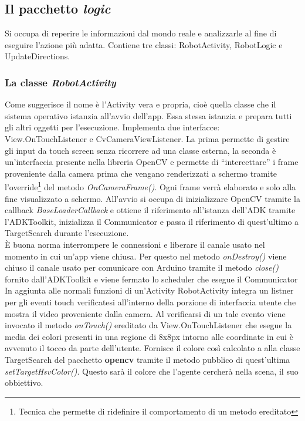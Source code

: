 \subsection {Il pacchetto \textit{logic}}
Si occupa di reperire le informazioni dal mondo reale e analizzarle al fine di
eseguire l'azione più adatta.
Contiene tre classi: RobotActivity, RobotLogic e UpdateDirections.
\subsubsection{La classe \emph{RobotActivity}}
Come suggerisce il nome è l'Activity vera e propria, cioè quella classe che il 
sistema operativo istanzia all'avvio dell'app. Essa stessa istanzia e prepara tutti gli 
altri oggetti per l'esecuzione. Implementa due interfacce: View.OnTouchListener 
e CvCameraViewListener. 
La prima permette di gestire gli input da touch screen senza ricorrere ad una classe esterna,
la seconda è un'interfaccia presente nella libreria OpenCV e permette di ``intercettare''
i frame proveniente dalla camera prima che vengano renderizzati a schermo tramite 
l'override\footnote{Tecnica che permette di ridefinire il comportamento di un metodo 
ereditato} del metodo \textit{OnCameraFrame()}. Ogni frame verrà elaborato e solo alla
fine visualizzato a schermo.
All'avvio si occupa di inizializzare OpenCV tramite la 
callback \textit{BaseLoaderCallback} e ottiene il riferimento all'istanza dell'ADK
tramite l'ADKToolkit, inizializza il Communicator e passa il riferimento di quest'ultimo
 a TargetSearch durante l'esecuzione.\\È buona norma interrompere le connessioni e liberare il canale usato 
nel momento in cui un'app viene chiusa. Per questo nel metodo \emph{onDestroy()} 
viene chiuso il canale usato per comunicare con Arduino tramite il metodo \emph{close()}
fornito dall'ADKToolkit e viene fermato lo scheduler che esegue il Communicator\\
In aggiunta alle normali funzioni di un'Activity RobotActivity integra un 
listner per gli eventi touch verificatesi all'interno della porzione di 
interfaccia utente che mostra il video proveniente dalla camera. Al verificarsi di un
tale evento viene invocato il metodo \emph{onTouch()} ereditato da View.OnTouchListener 
che esegue la media dei colori presenti in una regione di 8x8px intorno alle coordinate
in cui è avvenuto il tocco da parte dell'utente. Fornisce il colore così calcolato a 
alla classe TargetSearch del pacchetto \textbf{opencv} tramite il metodo pubblico 
di quest'ultima \emph{setTargetHsvColor()}. Questo sarà il colore che l'agente cercherà
nella scena, il suo obbiettivo.

